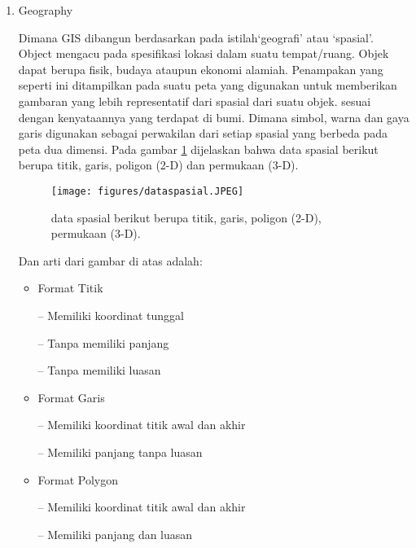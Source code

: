 \begin{enumerate}
\item Geography


Dimana GIS dibangun berdasarkan pada istilah‘geografi’ atau ‘spasial’.
Object mengacu pada spesifikasi lokasi dalam suatu tempat/ruang. Objek dapat berupa fisik,
budaya ataupun ekonomi alamiah. Penampakan yang seperti ini ditampilkan pada suatu peta yang 
digunakan untuk memberikan gambaran yang lebih representatif dari spasial dari suatu objek.
sesuai dengan kenyataannya yang terdapat di bumi. Dimana simbol, warna dan gaya garis digunakan sebagai
perwakilan dari setiap spasial yang berbeda pada peta dua dimensi.
Pada gambar \ref{dataspasial} dijelaskan bahwa data spasial berikut berupa 
titik, garis, poligon (2-D) dan permukaan (3-D).


\begin{figure}[ht]
	\centerline{\texttt{[image: figures/dataspasial.JPEG]}}
	\caption{data spasial berikut berupa titik, garis, poligon (2-D), permukaan (3-D).}
	\label{dataspasial}
	\end{figure}


Dan arti dari gambar di atas adalah:
\begin{itemize} 
\item Format Titik
\end{itemize}

\begin{itemize} 						
\item[--] Memiliki koordinat tunggal 		
\item[--] Tanpa memiliki panjang 			
\item[--] Tanpa memiliki luasan
\end{itemize}

\begin{itemize} 
\item Format Garis
\end{itemize}

\begin{itemize}
\item[--] Memiliki koordinat titik awal dan akhir		
\item[--] Memiliki panjang tanpa luasan
\end{itemize}

\begin{itemize} 
\item Format Polygon
\end{itemize}

\begin{itemize} 					
\item[--] Memiliki koordinat titik awal dan akhir
\item[--] Memiliki panjang dan luasan
\end{itemize} 


\end{enumerate}
